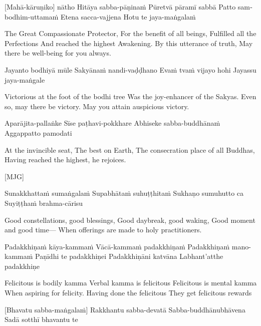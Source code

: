 \begin{english}
\begin{english}
\suttaRef{[Trad]}

[Mahā-kāruṇiko] nātho
Hitāya sabba-pāṇinaṁ
Pūretvā pāramī sabbā
Patto sambodhim-uttamaṁ
Etena sacca-vajjena
Hotu te jaya-maṅgalaṁ

\begin{english}
  The Great Compassionate Protector,
  For the benefit of all beings,
  Fulfilled all the Perfections
  And reached the highest Awakening.
  By this utterance of truth,
  May there be well-being for you always.
\end{english}

Jayanto bodhiyā mūle
Sakyānaṁ nandi-vaḍḍhano
Evaṁ tvaṁ vijayo hohi
Jayassu jaya-maṅgale

\begin{english}
  Victorious at the foot of the bodhi tree
  Was the joy-enhancer of the Sakyas.
  Even so, may there be victory.
  May you attain auspicious victory.
\end{english}

Aparājita-pallaṅke
Sīse paṭhavi-pokkhare
Abhiseke sabba-buddhānaṁ
Aggappatto pamodati

\begin{english}
  At the invincible seat,
  The best on Earth,
  The consecration place of all Buddhas,
  Having reached the highest, he rejoices.
\end{english}

[MJG]

Sunakkhattaṁ sumaṅgalaṁ
Supabhātaṁ suhuṭṭhitaṁ
Sukhaṇo sumuhutto ca
Suyiṭṭhaṁ brahma-cārisu

\begin{english}
  Good constellations, good blessings,
  Good daybreak, good waking,
  Good moment and good time—
  When offerings are made to holy practitioners.
\end{english}

Padakkhiṇaṁ kāya-kammaṁ
Vācā-kammaṁ padakkhiṇaṁ
Padakkhiṇaṁ mano-kammaṁ
Paṇīdhi te padakkhiṇei
Padakkhiṇāni katvāna
Labhant’atthe padakkhiṇe

\begin{english}
  Felicitous is bodily kamma
  Verbal kamma is felicitous
  Felicitous is mental kamma
  When aspiring for felicity.
  Having done the felicitous
  They get felicitous rewards
\end{english}

\suttaRef{[AN 3.155]}

[Bhavatu sabba-maṅgalaṁ]
Rakkhantu sabba-devatā
Sabba-buddhānubhāvena
Sadā sotthī bhavantu te


\end{english}
\end{english}
